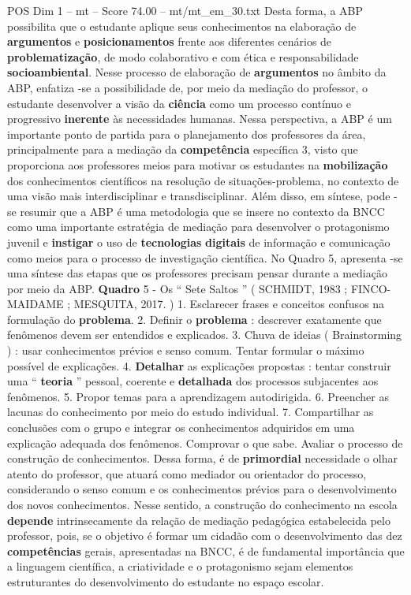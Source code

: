 \begin{textsample}{POS Dim 1 – mt – Score 74.00 – mt/mt\_em\_30.txt}
Desta forma, a ABP possibilita que o estudante aplique seus conhecimentos na elaboração de \textbf{argumentos} e \textbf{posicionamentos} frente aos diferentes cenários de \textbf{problematização}, de modo colaborativo e com ética e responsabilidade \textbf{socioambiental}.
Nesse processo de elaboração de \textbf{argumentos} no âmbito da ABP, enfatiza -se a possibilidade de, por meio da mediação do professor, o estudante desenvolver a visão da \textbf{ciência} como um processo contínuo e progressivo \textbf{inerente} às necessidades humanas.
Nessa perspectiva, a ABP é um importante ponto de partida para o planejamento dos professores da área, principalmente para a mediação da \textbf{competência} específica 3, visto que proporciona aos professores meios para motivar os estudantes na \textbf{mobilização} dos conhecimentos científicos na resolução de situações-problema, no contexto de uma visão mais interdisciplinar e transdisciplinar.
Além disso, em síntese, pode -se resumir que a ABP é uma metodologia que se insere no contexto da BNCC como uma importante estratégia de mediação para desenvolver o protagonismo juvenil e \textbf{instigar} o uso de \textbf{tecnologias} \textbf{digitais} de informação e comunicação como meios para o processo de investigação científica.
No Quadro 5, apresenta -se uma síntese das etapas que os professores precisam pensar durante a mediação por meio da ABP. \textbf{Quadro} 5 - Os “ Sete Saltos ” ( SCHMIDT, 1983 ; FINCO-MAIDAME ; MESQUITA, 2017. ) 1.
Esclarecer frases e conceitos confusos na formulação do \textbf{problema}. 2.
Definir o \textbf{problema} : descrever exatamente que fenômenos devem ser entendidos e explicados. 3.
Chuva de ideias ( Brainstorming ) : usar conhecimentos prévios e senso comum.
Tentar formular o máximo possível de explicações. 4. \textbf{Detalhar} as explicações propostas : tentar construir uma “ \textbf{teoria} ” pessoal, coerente e \textbf{detalhada} dos processos subjacentes aos fenômenos. 5.
Propor temas para a aprendizagem autodirigida. 6.
Preencher as lacunas do conhecimento por meio do estudo individual. 7.
Compartilhar as conclusões com o grupo e integrar os conhecimentos adquiridos em uma explicação adequada dos fenômenos.
Comprovar o que sabe.
Avaliar o processo de construção de conhecimentos.
Dessa forma, é de \textbf{primordial} necessidade o olhar atento do professor, que atuará como mediador ou orientador do processo, considerando o senso comum e os conhecimentos prévios para o desenvolvimento dos novos conhecimentos.
Nesse sentido, a construção do conhecimento na escola \textbf{depende} intrinsecamente da relação de mediação pedagógica estabelecida pelo professor, pois, se o objetivo é formar um cidadão com o desenvolvimento das dez \textbf{competências} gerais, apresentadas na BNCC, é de fundamental importância que a linguagem científica, a criatividade e o protagonismo sejam elementos estruturantes do desenvolvimento do estudante no espaço escolar.

\end{textsample}
